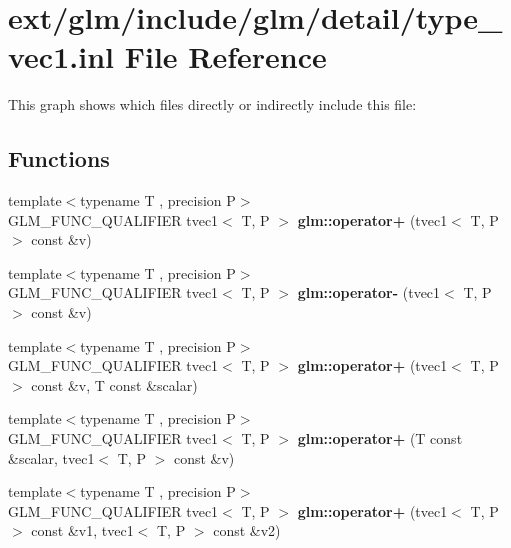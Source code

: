 \hypertarget{type__vec1_8inl}{\section{ext/glm/include/glm/detail/type\-\_\-vec1.inl File Reference}
\label{type__vec1_8inl}
}
This graph shows which files directly or indirectly include this file\-:
\subsection*{Functions}
\begin{DoxyCompactItemize}
\item 
\hypertarget{namespaceglm_ae4e916e7ac002004f4768efb4589dd5a}{{\footnotesize template$<$typename T , precision P$>$ }\\G\-L\-M\-\_\-\-F\-U\-N\-C\-\_\-\-Q\-U\-A\-L\-I\-F\-I\-E\-R tvec1$<$ T, P $>$ {\bfseries glm\-::operator+} (tvec1$<$ T, P $>$ const \&v)}\label{namespaceglm_ae4e916e7ac002004f4768efb4589dd5a}

\item 
\hypertarget{namespaceglm_ac3f9c05afa9b75ec6fdfe03148300a1d}{{\footnotesize template$<$typename T , precision P$>$ }\\G\-L\-M\-\_\-\-F\-U\-N\-C\-\_\-\-Q\-U\-A\-L\-I\-F\-I\-E\-R tvec1$<$ T, P $>$ {\bfseries glm\-::operator-\/} (tvec1$<$ T, P $>$ const \&v)}\label{namespaceglm_ac3f9c05afa9b75ec6fdfe03148300a1d}

\item 
\hypertarget{namespaceglm_a2a8161487706493501853bff7f85036e}{{\footnotesize template$<$typename T , precision P$>$ }\\G\-L\-M\-\_\-\-F\-U\-N\-C\-\_\-\-Q\-U\-A\-L\-I\-F\-I\-E\-R tvec1$<$ T, P $>$ {\bfseries glm\-::operator+} (tvec1$<$ T, P $>$ const \&v, T const \&scalar)}\label{namespaceglm_a2a8161487706493501853bff7f85036e}

\item 
\hypertarget{namespaceglm_a9dc2706945c9c3f1225e3961cbab259e}{{\footnotesize template$<$typename T , precision P$>$ }\\G\-L\-M\-\_\-\-F\-U\-N\-C\-\_\-\-Q\-U\-A\-L\-I\-F\-I\-E\-R tvec1$<$ T, P $>$ {\bfseries glm\-::operator+} (T const \&scalar, tvec1$<$ T, P $>$ const \&v)}\label{namespaceglm_a9dc2706945c9c3f1225e3961cbab259e}

\item 
\hypertarget{namespaceglm_ae381e4d867bba4a184aea9bb1dd4032f}{{\footnotesize template$<$typename T , precision P$>$ }\\G\-L\-M\-\_\-\-F\-U\-N\-C\-\_\-\-Q\-U\-A\-L\-I\-F\-I\-E\-R tvec1$<$ T, P $>$ {\bfseries glm\-::operator+} (tvec1$<$ T, P $>$ const \&v1, tvec1$<$ T, P $>$ const \&v2)}\label{namespaceglm_ae381e4d867bba4a184aea9bb1dd4032f}


\end{DoxyCompactItemize}
